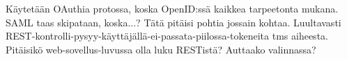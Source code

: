 Käytetään OAuthia protossa, koska OpenID:ssä kaikkea tarpeetonta mukana. SAML taas skipataan, koska...? Tätä pitäisi pohtia jossain kohtaa. Luultavasti REST-kontrolli-pysyy-käyttäjällä-ei-passata-piilossa-tokeneita tms aiheesta. Pitäisikö web-sovellus-luvussa olla luku RESTistä? Auttaako valinnassa?